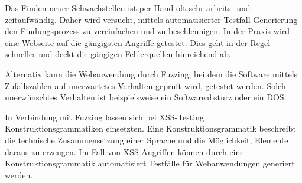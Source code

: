 Das Finden neuer Schwachstellen ist per Hand oft sehr arbeits- und zeitaufwändig. Daher wird versucht, mittels automatisierter Testfall-Generierung den Findungsprozess zu vereinfachen und zu beschleunigen. In der Praxis wird eine Webseite auf die gängigsten Angriffe getestet. Dies geht in der Regel schneller und deckt die gängigen Fehlerquellen hinreichend ab.

Alternativ kann die Webanwendung durch Fuzzing, bei dem die Software mittels Zufallszahlen auf unerwartetes Verhalten geprüft wird, getestet werden. Solch unerwünschtes Verhalten ist beispielsweise ein Softwareabsturz oder ein \ac{DOS}.

In Verbindung mit Fuzzing lassen sich bei XSS-Testing Konstruktionsgrammatiken einsetzten. Eine Konstruktionsgrammatik beschreibt die technische Zusammensetzung einer Sprache und die Möglichkeit, Elemente daraus zu erzeugen. Im Fall von XSS-Angriffen können durch eine Konstruktionsgrammatik automatisiert Testfälle für Webanwendungen generiert werden. 